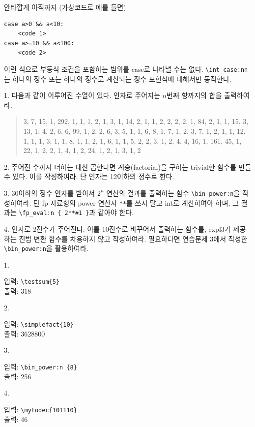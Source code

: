 \documentclass[a4paper,amsmath]{oblivoir}
\begin{document}
\bigskip

안타깝게 아직까지 (가상코드로 예를 들면)
\begin{verbatim}
case a>0 && a<10:
    <code 1>
case a>=10 && a<100:
    <code 2>
\end{verbatim}
이런 식으로 부등식 조건을 포함하는 범위를 case로 나타낼 수는 없다. \verb|\int_case:nn|는 하나의 정수 또는 하나의 정수로 계산되는 정수 표현식에 대해서만 동작한다.

\vfill


\begin{questionp}
 1. 다음과 같이 이루어진 수열이 있다. 인자로 주어지는 $n$번째 항까지의 합을 출력하여라.
\begin{quote}
3, 7, 15, 1, 292, 1, 1, 1, 2, 1, 3, 1, 14, 2, 1, 1, 2, 2, 2, 2, 1, 84, 2, 1, 1, 15, 3, 13, 1, 4, 2, 6, 6, 99, 1, 2, 2, 6, 3, 5, 1, 1, 6, 8, 1, 7, 1, 2, 3, 7, 1, 2, 1, 1, 12, 1, 1, 1, 3, 1, 1, 8, 1, 1, 2, 1, 6, 1, 1, 5, 2, 2, 3, 1, 2, 4, 4, 16, 1, 161, 45, 1, 22, 1, 2, 2, 1, 4, 1, 2, 24, 1, 2, 1, 3, 1, 2
\end{quote}

\bigskip

 2. 주어진 수까지 더하는 대신 곱한다면 계승(factorial)을 구하는 trivial한 함수를 만들 수 있다. 이를 작성하여라. 단 인자는 12이하의 정수로 한다. 

\bigskip

 3. 30이하의 정수 인자를 받아서 $2^n$ 연산의 결과를 출력하는 함수 \verb|\bin_power:n|을 작성하여라. 단 \textsf{fp} 자료형의 power 연산자 \verb|**|를 쓰지 말고 \textsf{int}로 계산하여야 하며, 그 결과는 \verb|\fp_eval:n { 2**#1 }|과 같아야 한다.

\bigskip

 4. 인자로 2진수가 주어진다. 이를 10진수로 바꾸어서 출력하는 함수를, expl3가 제공하는 진법 변환 함수를 차용하지 않고 작성하여라. 필요하다면 연습문제 3에서 작성한 \verb|\bin_power:n|을 활용하여라.

\tcblower

1. \begin{minipage}[t]{10cm}
입력: \verb|\testsum{5}|\\
출력: $318$
\end{minipage}

\bigskip

2. \begin{minipage}[t]{10cm}
입력: \verb|\simplefact{10}| \\
출력: 3628800
\end{minipage}

\bigskip

3. \begin{minipage}[t]{10cm}
입력: \verb|\bin_power:n {8}| \\
출력: 256
\end{minipage}

\bigskip

4. \begin{minipage}[t]{10cm}
입력: \verb|\mytodec{101110}| \\
출력: 46
\end{minipage}

\end{questionp}
\end{document}
